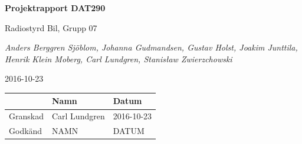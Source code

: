 \documentclass[a4paper]{article}
\begin{document}
\begin{titlepage}
\centering
{\bfseries\huge Projektrapport DAT290}

\vspace{10mm}

{\Large Radiostyrd Bil, Grupp 07}

\vspace{20mm}

{\Large \itshape{Anders Berggren Sjöblom, Johanna Gudmandsen, Gustav Holst, Joakim Junttila, Henrik Klein Moberg, Carl Lundgren, Stanisław Zwierzchowski}}

\vspace{10mm}

{2016-10-23}


\normalsize{
\begin{table}[b]
\centering
\begin{tabular}{|l|l|l|}  \hline
        & \bf Namn & \bf Datum   \\ \hline \hline
Granskad & Carl Lundgren     & 2016-10-23        \\ \hline
Godkänd  & NAMN     & DATUM         \\ \hline
\end{tabular}
\end{table}}
\end{titlepage}

\tableofcontents
\end{document}
